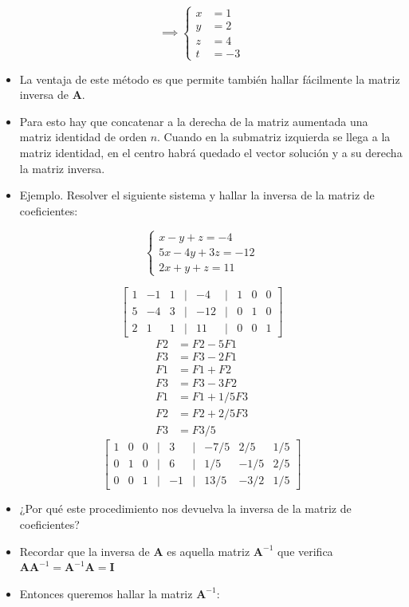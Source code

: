 \documentclass[openany]{book}
\providecommand{\tightlist}{%
  \setlength{\itemsep}{0pt}\setlength{\parskip}{0pt}}
\begin{document}
\[
\implies
\left\{
\begin{aligned}
x &= 1\\ y &= 2\\ z &= 4\\ t &= -3
\end{aligned}
\right.
\]

\begin{itemize}
\tightlist
\item
  La ventaja de este método es que permite también hallar fácilmente la matriz inversa de \(\mathbf{A}\).
\item
  Para esto hay que concatenar a la derecha de la matriz aumentada una matriz identidad de orden \(n\). Cuando en la submatriz izquierda se llega a la matriz identidad, en el centro habrá quedado el vector solución y a su derecha la matriz inversa.
\item
  Ejemplo. Resolver el siguiente sistema y hallar la inversa de la matriz de coeficientes:
\end{itemize}

\[
\begin{cases} 
x-y+z=-4 \\
5x-4y+3z=-12 \\
2x+y+z=11
\end{cases}
\]

\[
\begin{bmatrix}
    1 & -1 & 1 &|& -4 &|& 1 & 0 & 0\\
    5 & -4 & 3 &|& -12 &|& 0 & 1 & 0\\
    2 & 1 & 1 &|& 11 &|& 0 & 0 & 1
\end{bmatrix}
\]
\[
\begin{array}{cl}
    F2 &= F2 - 5 F1 \\
    F3 &= F3 - 2 F1 \\
    F1 &= F1 + F2 \\
    F3 &= F3 - 3 F2 \\
    F1 &= F1 + 1/5 F3 \\
    F2 &= F2 + 2/5 F3  \\
    F3 &= F3 / 5
\end{array}
\]
\[
\begin{bmatrix}
    1 & 0 & 0 &|& 3 &|& -7/5 & 2/5 & 1/5\\
    0 & 1 & 0 &|& 6 &|& 1/5 & -1/5 & 2/5\\
    0 & 0 & 1 &|& -1 &|& 13/5 & -3/2 & 1/5
\end{bmatrix}
\]

\begin{itemize}
\tightlist
\item
  ¿Por qué este procedimiento nos devuelva la inversa de la matriz de coeficientes?
\item
  Recordar que la inversa de \(\mathbf{A}\) es aquella matriz \(\mathbf{A}^{-1}\) que verifica \(\mathbf{AA}^{-1} =\mathbf{A}^{-1}\mathbf{A}=\mathbf{I}\)
\item
  Entonces queremos hallar la matriz \(\mathbf{A}^{-1}\):
\end{itemize}
\end{document}
